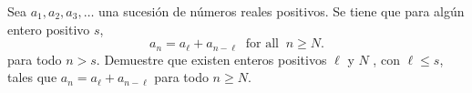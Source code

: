 Sea $a_1, a_2, a_3, \dots$ una sucesión de números reales positivos. Se tiene que para algún
entero positivo $s$,
\[a_n = a_{\ell} + a_{n - \ell} \ \textrm{ for all } \ n \geq N.\]
para todo $n > s$. Demuestre que existen enteros positivos $\ell$ y $N$ , con $\ell \leq s$, tales que $a_n = a_{\ell} + a_{n−\ell}$ para todo $n \geq N$.